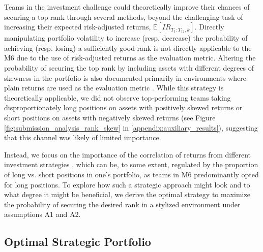 \documentclass[3p,times,twocolumn]{elsarticle}
\begin{document}
Teams in the investment challenge could theoretically improve their chances of securing a top rank through several methods, beyond the challenging task of increasing their expected risk-adjusted returns, $\mathbb{E}[IR_{T_{1}:T_{12},k}]$.
Directly manipulating portfolio volatility to increase (resp. decrease) the probability of achieving (resp. losing) a sufficiently good rank \citep[see, e.g.,][]{brownTournamentsTemptationsAnalysis1996,eltonIncentiveFeesMutual2003} is not directly applicable to the M6 due to the use of risk-adjusted returns as the evaluation metric.
Altering the probability of securing the top rank by including assets with different degrees of skewness in the portfolio is also documented primarily in environments where plain returns are used as the evaluation metric \citep[see, e.g.,][]{linFundConvexityTail2011,dijkRankMattersImpact2014}.
While this strategy is theoretically applicable, we did not observe top-performing teams taking disproportionately long positions on assets with positively skewed returns or short positions on assets with negatively skewed returns (see Figure \ref{fig:submission_analysis_rank_skew} in \ref{appendix:auxiliary_results}), suggesting that this channel was likely of limited importance.

Instead, we focus on the importance of the correlation of returns from different investment strategies \citep[see, e.g.,][]{niekenRisktakingTournamentsTheory2010,krasnyAssetPricingStatus2011}, which can be, to some extent, regulated by the proportion of long vs. short positions in one's portfolio, as teams in M6 predominantly opted for long positions.
To explore how such a strategic approach might look and to what degree it might be beneficial, we derive the optimal strategy to maximize the probability of securing the desired rank in a stylized environment under assumptions A1 and A2.

\subsection{Optimal Strategic Portfolio}\label{subsection:strategic_portfolio}
\end{document}
